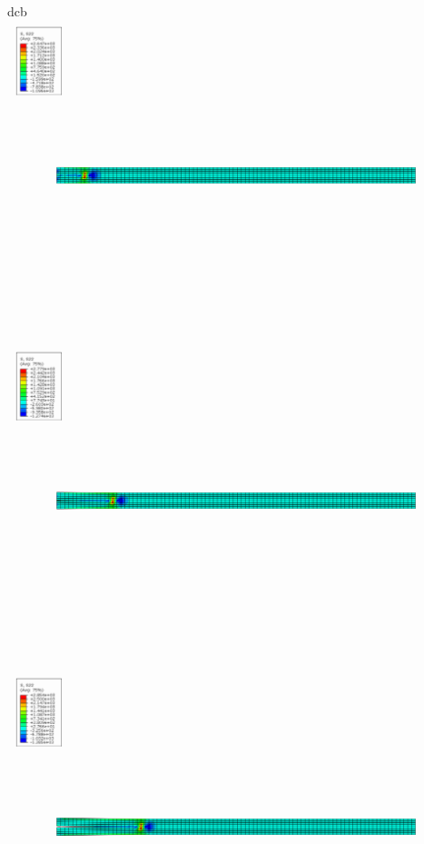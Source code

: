 \documentclass[
  letterpaper,
  ignorenonframetext,
  aspectratio=43,
  handout,
  12pt]{beamer}
\let\Oldincludegraphics\includegraphics
\renewcommand{\includegraphics}[2][]{\Oldincludegraphics[width=\textwidth,height=0.7\textheight,keepaspectratio]{#2}}
\begin{document}
\begin{frame}{dcb}
\includegraphics{../images/dcb3.png}

\includegraphics{../images/dcb4.png}

\includegraphics{../images/dcb5.png}


\end{frame}
\end{document}

